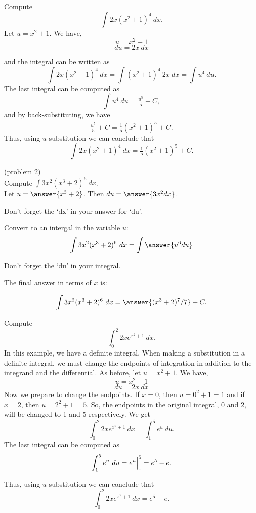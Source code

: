 \documentclass[handout]{ximera}
\begin{document}
\begin{example}[example 2] Compute 
\[\int 2x(x^2 + 1)^4 \ dx.\]
Let $u = x^2 + 1$.  We have,
\[u = x^2 + 1\]
\[du = 2x \ dx\]

and the integral can be written as 
\[\int 2x(x^2 + 1)^4 \ dx = \int (x^2 + 1)^4 \ 2x \  dx = \int u^4 \ du.\]
The last integral can be computed as 
\[\int u^4 \ du = \tfrac{u^5}{5} + C,\]
and by back-substituting, we have 
\[\tfrac{u^5}{5} + C = \tfrac15(x^2 + 1)^5 + C .\]
Thus, using $u$-substitution we can conclude that
\[\int 2x(x^2 + 1)^4 \ dx  =  \tfrac15(x^2 + 1)^5 + C.\]
\end{example}

\begin{problem}(problem 2)\\
Compute $\displaystyle{\int 3x^2(x^3 + 2)^6 \ dx}$.\\
Let $u = \answer{x^3 + 2}$. Then $du = \answer{3x^2 dx}$.\\
\begin{hint}
Don't forget the `dx' in your answer for `du'.
\end{hint}
Convert to an intergal in the variable $u$:
\[\int 3x^2(x^3 + 2)^6 \ dx = \int\answer{u^6 du}\]
\begin{hint}
Don't forget the `du' in your integral.
\end{hint}
The final answer in terms of $x$ is:

\[\int 3x^2(x^3 + 2)^6 \ dx = \answer{(x^3 + 2)^7/7} +C.\]
\end{problem}



\begin{example}[example 3] Compute 
\[\int_0^2 2xe^{x^2 + 1} \ dx.\]
In this example, we have a definite integral.  When making a substitution in a definite integral, 
we must change the endpoints of integration in addition to the integrand and the differential.
As before, let $u = x^2 + 1$.  We have,
\[u = x^2 + 1\]
\[du = 2x \ dx\]
Now we prepare to change the endpoints. If $x = 0$, then $ u = 0^2 + 1 = 1$ and if $x = 2$, then $u = 2^2 +1 = 5$.
So, the endpoints in the original integral, 0 and 2, will be changed to 1 and 5 respectively. We get
\[\int_0^2 2xe^{x^2 + 1} \ dx  = \int_1^5  e^u \ du.\]
The last integral can be computed as 
\[\int_1^5 e^u \ du = e^u \Big{|}_1^5 = e^5 - e.\]

Thus, using $u$-substitution we can conclude that
\[\int_0^2 2xe^{x^2 + 1} \ dx =  e^5 - e.\]
\end{example}
\end{document}
